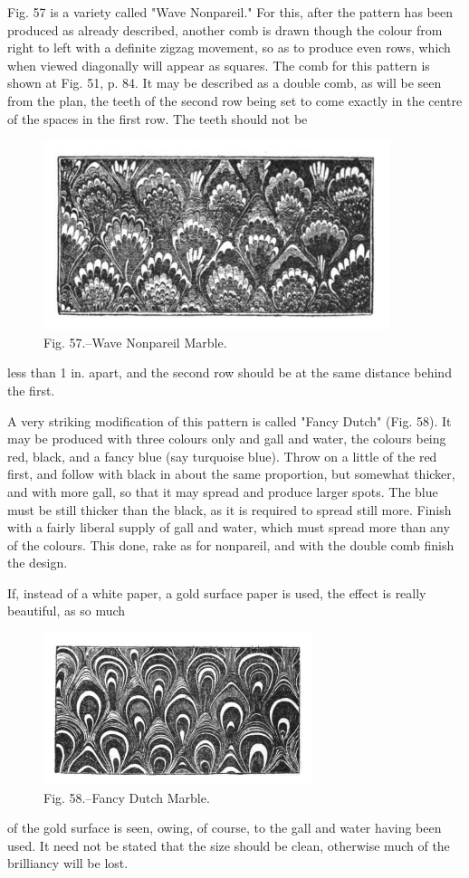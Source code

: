 \documentclass[twoside]{book}
\begin{document}
Fig. 57 is a variety called "Wave Nonpareil."
For this, after the pattern has been produced as
already described, another comb is drawn though the
colour from right to left with a definite zigzag
movement, so as to produce even rows, which when
viewed diagonally will appear as squares. The
comb for this pattern is shown at Fig. 51, p. 84.
It may be described as a double comb, as will be
seen from the plan, the teeth of the second row
being set to come exactly in the centre of the
spaces in the first row. The teeth should not be
	\begin{figure}[h]
		\centering
		\includegraphics[width=0.9\textwidth]{Figures/_057.png}
		\caption*{Fig. 57.--Wave Nonpareil Marble.}
	\end{figure}
less than 1 in. apart, and the second row should
be at the same distance behind the first.

A very striking modification of this pattern is
called "Fancy Dutch" (Fig. 58). It may be produced
with three colours only and gall and water,
the colours being red, black, and a fancy blue (say
turquoise blue). Throw on a little of the red first,
and follow with black in about the same proportion,
but somewhat thicker, and with more gall,
so that it may spread and produce larger spots.
The blue must be still thicker than the black, as
it is required to spread still more. Finish with a
fairly liberal supply of gall and water, which must
spread more than any of the colours. This done,
\pagebreak
rake as for nonpareil, and with the double comb
finish the design.

If, instead of a white paper, a gold surface paper
is used, the effect is really beautiful, as so much
	\begin{figure}[h]
		\centering
		\includegraphics[width=0.7\textwidth]{Figures/_058.png}
		\caption*{Fig. 58.--Fancy Dutch Marble.}
	\end{figure}
of the gold surface is seen, owing, of course, to the
gall and water having been used. It need not be
stated that the size should be clean, otherwise
much of the brilliancy will be lost.
\end{document}
